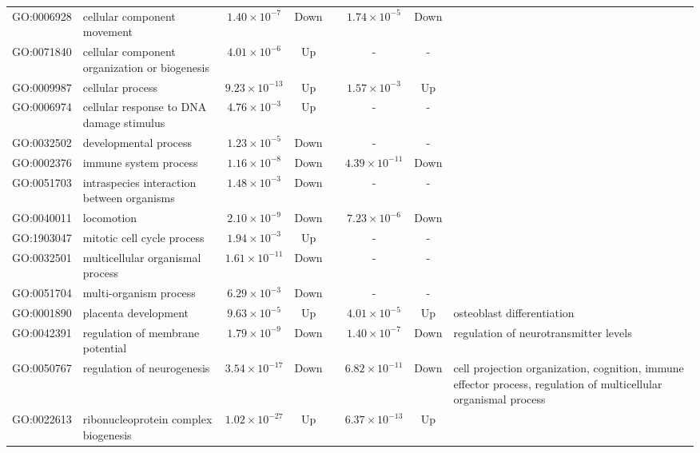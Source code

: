 {\begin{landscape}
\begin{longtable}{cp{3cm}cccccp{5cm}}
    GO:0006928 & cellular component movement & $1.40\times 10^{-7}$ & Down  &       & $1.74\times 10^{-5}$ & Down  &  \\
    GO:0071840 & cellular component organization or biogenesis & $4.01\times 10^{-6}$ & Up    &       & -     & -     &  \\
    GO:0009987 & cellular process & $9.23\times 10^{-13}$ & Up    &       & $1.57\times 10^{-3}$ & Up    &  \\
    GO:0006974 & cellular response to DNA damage stimulus & $4.76\times 10^{-3}$ & Up    &       & -     & -     &  \\
    GO:0032502 & developmental process & $1.23\times 10^{-5}$ & Down  &       & -     & -     &  \\
    GO:0002376 & immune system process & $1.16\times 10^{-8}$ & Down  &       & $4.39\times 10^{-11}$ & Down  &  \\
    GO:0051703 & intraspecies interaction between organisms & $1.48\times 10^{-3}$ & Down  &       & -     & -     &  \\
    GO:0040011 & locomotion & $2.10\times 10^{-9}$ & Down  &       & $7.23\times 10^{-6}$ & Down  &  \\
    GO:1903047 & mitotic cell cycle process & $1.94\times 10^{-3}$ & Up    &       & -     & -     &  \\
    GO:0032501 & multicellular organismal process & $1.61\times 10^{-11}$ & Down  &       & -     & -     &  \\
    GO:0051704 & multi-organism process & $6.29\times 10^{-3}$ & Down  &       & -     & -     &  \\
    GO:0001890 & placenta development & $9.63\times 10^{-5}$ & Up    &       & $4.01\times 10^{-5}$ & Up    & osteoblast differentiation \\
    GO:0042391 & regulation of membrane potential & $1.79\times 10^{-9}$ & Down  &       & $1.40\times 10^{-7}$ & Down  & regulation of neurotransmitter levels \\
    GO:0050767 & regulation of neurogenesis & $3.54\times 10^{-17}$ & Down  &       & $6.82\times 10^{-11}$ & Down  & cell projection organization, cognition, immune effector process, regulation of multicellular organismal process \\
    \multicolumn{1}{c}{GO:0022613} & ribonucleoprotein complex biogenesis & \multicolumn{1}{c}{$1.02\times 10^{-27}$} & \multicolumn{1}{c}{Up} & \multicolumn{1}{c}{} & \multicolumn{1}{c}{$6.37\times 10^{-13}$} & \multicolumn{1}{c}{Up} &  \\

\end{longtable}
\end{landscape}}
